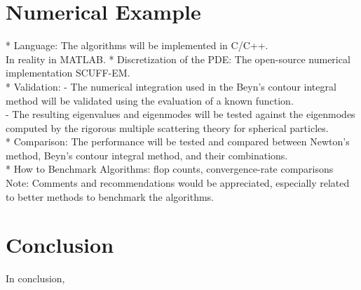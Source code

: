 \documentclass[11pt,letterpaper]{article}
\begin{document}
\begin{multicols}{2}
\section{Numerical Example}
* Language: The algorithms will be implemented in C/C++.\\
In reality in MATLAB. 
* Discretization of the PDE: The open-source numerical implementation SCUFF-EM.\citep{SCUFF1}\\
* Validation: 
- The numerical integration used in the Beyn's contour integral method will be validated using the evaluation of a known function. \\
- The resulting eigenvalues and eigenmodes will be tested against the eigenmodes computed by the rigorous multiple scattering theory for spherical particles. \citep{xu1995electromagnetic}\\
* Comparison: The performance will be tested and compared between Newton's method, Beyn's contour integral method, and their combinations.  \\
* How to Benchmark Algorithms: flop counts, convergence-rate comparisons\\
Note: Comments and recommendations would be appreciated, especially related to better methods to benchmark the algorithms.  

\section{Conclusion}
In conclusion, 


\end{multicols}
\end{document}
